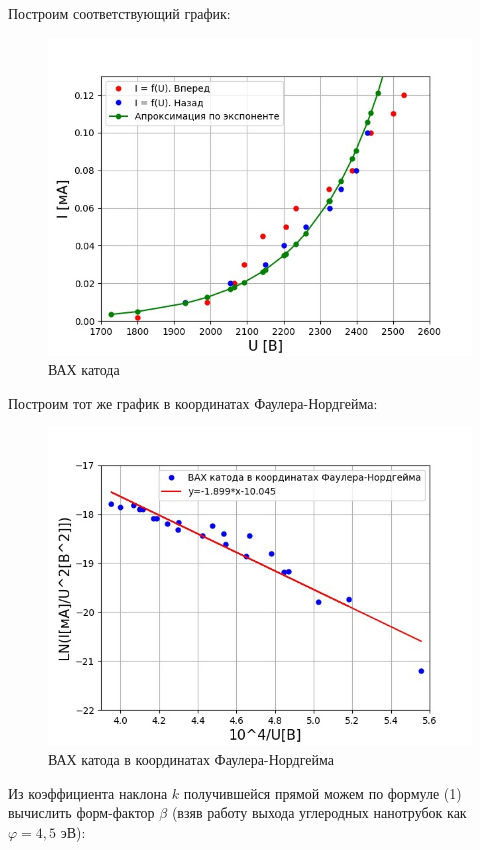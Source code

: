 \documentclass[a4paper,12pt]{article}
\theoremstyle{plain} %
\theoremstyle{definition} %
\theoremstyle{remark} %
\begin{document}
Построим соответствующий график:

\begin{figure}[H]
	\centering
	\includegraphics[scale=0.55]{pic2.jpg}
	\caption{ВАХ катода}
	\label{pic2}
\end{figure}

Построим тот же график в координатах Фаулера-Нордгейма:

\begin{figure}[H]
	\centering
	\includegraphics[scale=0.55]{pic3.jpg}
	\caption{ВАХ катода в координатах Фаулера-Нордгейма}
	\label{pic2}
\end{figure}


Из коэффициента наклона $k$ получившейся прямой можем по формуле (1) вычислить форм-фактор $\beta$ (взяв работу выхода углеродных нанотрубок как $\varphi = 4,5$ эВ):
\end{document}
